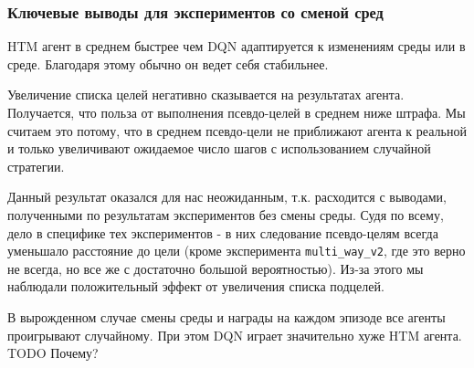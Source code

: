 \documentclass[a4paper]{article}
\begin{document}
\subsubsection {Ключевые выводы для экспериментов со сменой сред}

HTM агент в среднем быстрее чем DQN адаптируется к изменениям среды или в среде. Благодаря этому обычно он ведет себя стабильнее.

Увеличение списка целей негативно сказывается на результатах агента. Получается, что польза от выполнения псевдо-целей в среднем ниже штрафа. Мы считаем это потому, что в среднем псевдо-цели не приближают агента к реальной и только увеличивают ожидаемое число шагов с использованием случайной стратегии.

Данный результат оказался для нас неожиданным, т.к. расходится с выводами, полученными по результатам экспериментов без смены среды. Судя по всему, дело в специфике тех экспериментов - в них следование псевдо-целям всегда уменьшало расстояние до цели (кроме эксперимента \verb|multi_way_v2|, где это верно не всегда, но все же с достаточно большой вероятностью). Из-за этого мы наблюдали положительный эффект от увеличения списка подцелей.

В вырожденном случае смены среды и награды на каждом эпизоде все агенты проигрывают случайному. При этом DQN играет значительно хуже HTM агента. TODO Почему?
\end{document}
